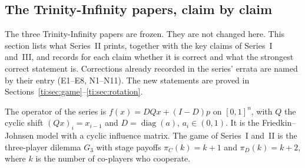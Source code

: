 \documentclass[11pt]{amsart}
\theoremstyle{remark}
\begin{document}
\subsection{The Trinity-Infinity papers, claim by claim}\label{ti:sec:inventory}

The three Trinity-Infinity papers \cite{SeriesI,SeriesII,SeriesIII} are frozen.
They are not changed here. This section lists what Series~II prints, together with the key claims
of Series~I and~III, and records for each claim whether it is correct and what the strongest
correct statement is. Corrections already recorded in the series' errata \cite{errata} are named by their
entry (E1--E8, N1--N11). The new statements are proved in
Sections~\ref{ti:sec:game}--\ref{ti:sec:rotation}.

The operator of the series is $f(x)=DQx+(I-D)p$ on $[0,1]^n$, with $Q$ the cyclic shift
$(Qx)_i=x_{i-1}$ and $D=\operatorname{diag}(a)$, $a_i\in(0,1)$. It is the Friedkin--Johnsen
model \cite{FJ90,FJ99} with a cyclic influence matrix. The game of
Series~I and~II is the three-player dilemma $G_3$ with stage payoffs $\pi_C(k)=k+1$ and
$\pi_D(k)=k+2$, where $k$ is the number of co-players who cooperate.
\end{document}
